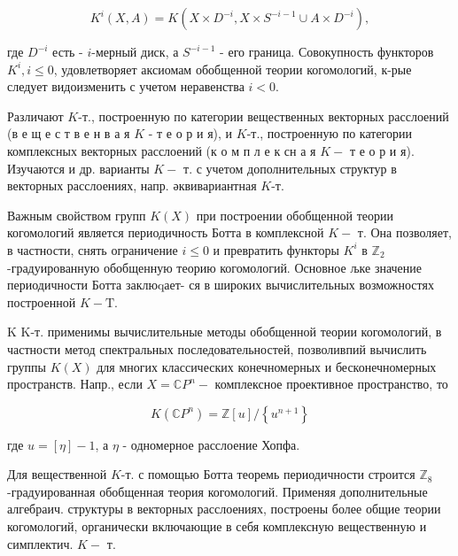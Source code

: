 \documentclass[10pt]{article}
\begin{document}
\[

K^{i}(X, A)=K\left(X \times D^{-i}, X \times S^{-i-1} \cup A \times D^{-i}\right),

\]



где $D^{-i}$ есть - $i$-мерный диск, а $S^{-i-1}$ - его граница. Совокупность функторов $K^{i}, i \leqslant 0$, удовлетворяет аксиомам обобщенной теории когомологий, к-рые следует видоизменить с учетом неравенства $i<0$.



Различают $K$-т., построенную по категории вещественных векторных расслоений (в е щ е с т в е н в а я $K$ - т е о р и я), и $K$-т., построенную по категории комплексных векторных расслоений (к о м п л е к сн а я $K-$ т е о р и я). Изучаются и др. варианты $K-$ т. с учетом дополнительных структур в векторных расслоениях, напр. әквивариантная $K$-т.



Важным свойством групп $K(X)$ при построении обобщенной теории когомологий является периодичность Ботта в комплексной $K-$ т. Она позволяет, в частности, снять ограничение $i \leqslant 0$ и превратить функторы $K^{i}$ в $\mathbb{Z}_{2}$-градуированную обобщенную теорию когомологий. Основное љке значение периодичности Ботта заклюqает- ся в широких вычислительных возможностях построенной $K-\mathrm{T}$.



K K-т. применимы вычислительные методы обобщенной теории когомологий, в частности метод спектральных последовательностей, позволивпий вычислить группы $K(X)$ для многих классических конечномерных и бесконечномерных пространств. Напр., если $X=\mathbb{C} P^{n}-$ комплексное проективное пространство, то



\[

K\left(\mathbb{C} P^{n}\right)=\mathbb{Z}[u] /\left\{u^{n+1}\right\}

\]



где $u=[\eta]-1$, а $\eta$ - одномерное расслоение Хопфа.



Для вещественной $K$-т. с помощью Ботта теоремь периодичности строится $\mathbb{Z}_{8}$-градуированная обобщенная теория когомологий. Применяя дополнительные алгебраич. структуры в векторных расслоениях, построены более общие теории когомологий, органически включающие в себя комплексную вещественную и симплектич. $K-$ т.
\end{document}
